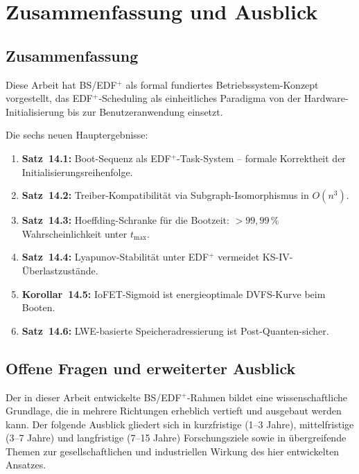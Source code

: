 ﻿\documentclass[a4paper,12pt]{scrreprt}
\theoremstyle{definition}
\begin{document}
	\chapter{Zusammenfassung und Ausblick}
	
	\section{Zusammenfassung}
	
	Diese Arbeit hat BS/EDF$^+$ als formal fundiertes Betriebssystem-Konzept
	vorgestellt, das EDF$^+$-Scheduling als einheitliches Paradigma von der
	Hardware-Initialisierung bis zur Benutzeranwendung einsetzt.
	
	Die sechs neuen Hauptergebnisse:
	\begin{enumerate}
		\item \textbf{Satz~14.1:} Boot-Sequenz als EDF$^+$-Task-System --
		formale Korrektheit der Initialisierungsreihenfolge.
		\item \textbf{Satz~14.2:} Treiber-Kompatibilität via Subgraph-Isomorphismus
		in $O(n^3)$.
		\item \textbf{Satz~14.3:} Hoeffding-Schranke für die Bootzeit:
		$> 99{,}99\,\%$ Wahrscheinlichkeit unter $t_{\max}$.
		\item \textbf{Satz~14.4:} Lyapunov-Stabilität unter EDF$^+$ vermeidet
		KS-IV-Überlastzustände.
		\item \textbf{Korollar~14.5:} IoFET-Sigmoid ist energieoptimale
		DVFS-Kurve beim Booten.
		\item \textbf{Satz~14.6:} LWE-basierte Speicheradressierung ist
		Post-Quanten-sicher.
	\end{enumerate}
	
	\section{Offene Fragen und erweiterter Ausblick}
	
	Der in dieser Arbeit entwickelte BS/EDF$^+$-Rahmen bildet eine wissenschaftliche
	Grundlage, die in mehrere Richtungen erheblich vertieft und ausgebaut werden kann.
	Der folgende Ausblick gliedert sich in kurzfristige (1--3 Jahre),
	mittelfristige (3--7 Jahre) und langfristige (7--15 Jahre) Forschungsziele
	sowie in übergreifende Themen zur gesellschaftlichen und industriellen
	Wirkung des hier entwickelten Ansatzes.
	
\end{document}
